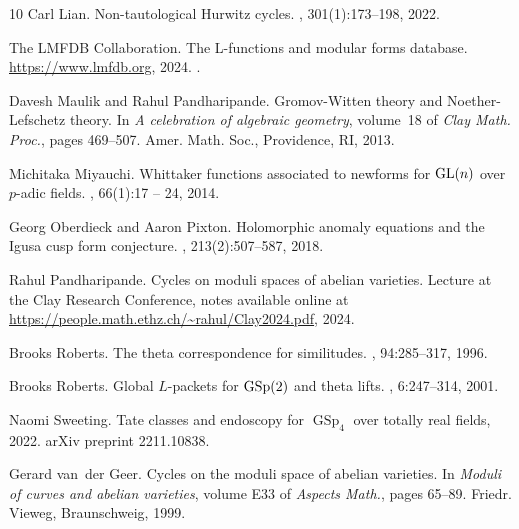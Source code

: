 \documentclass[12pt]{amsart}
\theoremstyle{definition}
\begin{document}
\begin{thebibliography}{10}
Carl Lian.
\newblock Non-tautological {H}urwitz cycles.
, 301(1):173--198, 2022.

The {LMFDB Collaboration}.
\newblock The {L}-functions and modular forms database.
\newblock \url{https://www.lmfdb.org}, 2024.
.

Davesh Maulik and Rahul Pandharipande.
\newblock Gromov-{W}itten theory and {N}oether-{L}efschetz theory.
\newblock In {\em A celebration of algebraic geometry}, volume~18 of {\em Clay
  Math. Proc.}, pages 469--507. Amer. Math. Soc., Providence, RI, 2013.

Michitaka Miyauchi.
\newblock Whittaker functions associated to newforms for {${\rm GL}(n)$} over
  $p$-adic fields.
, 66(1):17 -- 24,
  2014.

Georg Oberdieck and Aaron Pixton.
\newblock Holomorphic anomaly equations and the {I}gusa cusp form conjecture.
, 213(2):507--587, 2018.

Rahul Pandharipande.
\newblock Cycles on moduli spaces of abelian varieties.
\newblock Lecture at the Clay Research Conference, notes available online at
  \url{https://people.math.ethz.ch/~rahul/Clay2024.pdf}, 2024.

Brooks Roberts.
\newblock The theta correspondence for similitudes.
, 94:285--317, 1996.

Brooks Roberts.
\newblock Global {$L$}-packets for {${\rm GSp}(2)$} and theta lifts.
, 6:247--314, 2001.

Naomi Sweeting.
\newblock Tate classes and endoscopy for $\operatorname{GSp}_4$ over totally
  real fields, 2022.
\newblock arXiv preprint 2211.10838.

Gerard van~der Geer.
\newblock Cycles on the moduli space of abelian varieties.
\newblock In {\em Moduli of curves and abelian varieties}, volume E33 of {\em
  Aspects Math.}, pages 65--89. Friedr. Vieweg, Braunschweig, 1999.

\end{thebibliography}
\end{document}

